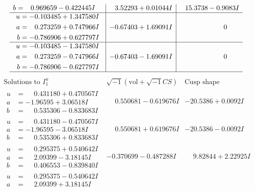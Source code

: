 \documentclass[1p]{elsarticle_modified}
\theoremstyle{definition}
\newcommand{\I}{\sqrt{-1}}
\begin{document}
$$\begin{array}{c|c|c}
\begin{aligned}
b &= \phantom{-}0.969659 - 0.422445 I\end{aligned}
 & \phantom{-}3.52293 + 0.01044 I & \phantom{-}15.3738 - 0.9083 I \\ \hline\begin{aligned}
u &= -0.103485 + 1.347580 I \\
a &= \phantom{-}0.273259 + 0.747966 I \\
b &= -0.786906 + 0.627797 I\end{aligned}
 & -0.67403 + 1.69091 I & \phantom{-0.000000 } 0 \\ \hline\begin{aligned}
u &= -0.103485 - 1.347580 I \\
a &= \phantom{-}0.273259 - 0.747966 I \\
b &= -0.786906 - 0.627797 I\end{aligned}
 & -0.67403 - 1.69091 I & \phantom{-0.000000 } 0\\
 \hline 
 \end{array}$$\newpage$$\begin{array}{c|c|c}  
\text{Solutions to }I^u_{1}& \I (\text{vol} + \sqrt{-1}CS) & \text{Cusp shape}\\
 \hline 
\begin{aligned}
u &= \phantom{-}0.431180 + 0.470567 I \\
a &= -1.96595 + 3.06518 I \\
b &= \phantom{-}0.535306 - 0.833683 I\end{aligned}
 & \phantom{-}0.550681 - 0.619676 I & -20.5386 + 0.0092 I \\ \hline\begin{aligned}
u &= \phantom{-}0.431180 - 0.470567 I \\
a &= -1.96595 - 3.06518 I \\
b &= \phantom{-}0.535306 + 0.833683 I\end{aligned}
 & \phantom{-}0.550681 + 0.619676 I & -20.5386 - 0.0092 I \\ \hline\begin{aligned}
u &= \phantom{-}0.295375 + 0.540642 I \\
a &= \phantom{-}2.09399 - 3.18145 I \\
b &= \phantom{-}0.406553 - 0.839840 I\end{aligned}
 & -0.370699 - 0.487288 I & \phantom{-}9.82844 + 2.22925 I \\ \hline\begin{aligned}
u &= \phantom{-}0.295375 - 0.540642 I \\
a &= \phantom{-}2.09399 + 3.18145 I \\

\end{aligned}
\end{array}$$
\end{document}

